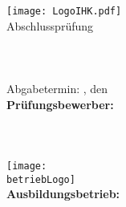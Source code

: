 \begin{titlepage}

\begin{center}
\texttt{[image: LogoIHK.pdf]}\\[1ex]
\Large{Abschlussprüfung \pruefungstermin}\\[3ex]

\Large{\ausbildungsberuf}\\
\LARGE{\betreff}\\[4ex]

\Large{\textbf{\titel}}\\[4ex]

\normalsize
Abgabetermin: \abgabeOrt, den \abgabeTermin\\[3em]
\textbf{Prüfungsbewerber:}\\
\autorName\\
\autorAnschrift\\
\autorOrt\\[5ex]

\texttt{[image: \\betriebLogo]}\\[2ex]
\textbf{Ausbildungsbetrieb:}\\
\betriebName\\
\betriebAnschrift\\
\betriebOrt\\[5em]
\end{center}

\end{titlepage}